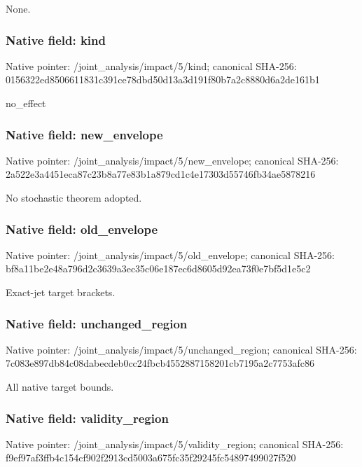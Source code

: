\documentclass[10pt,a4paper]{article}
\begin{document}
\begingroup\raggedright\sloppy None.\par\endgroup

\subsubsection{Native field: kind}
Native pointer: /joint\_\allowbreak{}analysis/impact/5/kind; canonical SHA-256: 0156322ed8506611831c391ce78dbd50d13a3d191f80b7a2c8880d6a2de161b1

\begingroup\raggedright\sloppy no\_\allowbreak{}effect\par\endgroup

\subsubsection{Native field: new\_\allowbreak{}envelope}
Native pointer: /joint\_\allowbreak{}analysis/impact/5/new\_\allowbreak{}envelope; canonical SHA-256: 2a522e3a4451eca87c23b8a77e83b1a879cd1c4e17303d55746fb34ae5878216

\begingroup\raggedright\sloppy No stochastic theorem adopted.\par\endgroup

\subsubsection{Native field: old\_\allowbreak{}envelope}
Native pointer: /joint\_\allowbreak{}analysis/impact/5/old\_\allowbreak{}envelope; canonical SHA-256: bf8a11be2e48a796d2c3639a3ec35c06e187ec6d8605d92ea73f0e7bf5d1e5c2

\begingroup\raggedright\sloppy Exact-jet target brackets.\par\endgroup

\subsubsection{Native field: unchanged\_\allowbreak{}region}
Native pointer: /joint\_\allowbreak{}analysis/impact/5/unchanged\_\allowbreak{}region; canonical SHA-256: 7c083e897db84c08dabecdeb0cc24fbcb4552887158201cb7195a2c7753afc86

\begingroup\raggedright\sloppy All native target bounds.\par\endgroup

\subsubsection{Native field: validity\_\allowbreak{}region}
Native pointer: /joint\_\allowbreak{}analysis/impact/5/validity\_\allowbreak{}region; canonical SHA-256: f9ef97af3ffb4c154cf902f2913cd5003a675fc35f29245fc54897499027f520
\end{document}
